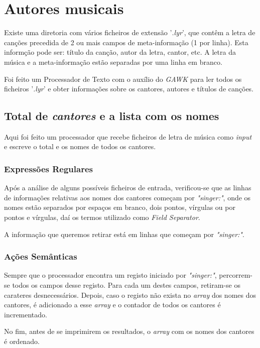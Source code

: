\documentclass{article}
\begin{document}
\section{Autores musicais}

Existe uma diretoria com vários ficheiros de extensão '\emph{.lyr}', que contêm a letra de canções precedida de 2 ou mais campos de meta-informação (1 por linha). Esta informção pode ser: título da canção, autor da letra, cantor, etc. A letra da música e a meta-informação estão separadas por uma linha em branco.

Foi feito um Processador de Texto com o auxílio do \emph{GAWK} para ler todos os ficheiros '\emph{.lyr}' e obter informações sobre os cantores, autores e títulos de canções.

\subsection{Total de \emph{cantores} e a lista com os nomes}

Aqui foi feito um processador que recebe ficheiros de letra de música como \emph{input} e escreve o total e os nomes de todos os cantores.

\subsubsection{Expressões Regulares}

Após a análise de alguns possíveis ficheiros de entrada, verificou-se que as linhas de informações relativas aos nomes dos cantores começam por \emph{"singer:"}, onde os nomes estão separados por espaços em branco, dois pontos, vírgulas ou por pontos e vírgulas, daí os termos utilizado como \emph{Field Separator}.

A informação que queremos retirar está em linhas que começam por \emph{"singer:"}.

\subsubsection{Ações Semânticas}

Sempre que o processador encontra um registo iniciado por \emph{"singer:"}, percorrem-se todos os campos desse registo. Para cada um destes campos, retiram-se os carateres desnecessários. Depois, caso o registo não exista no \emph{array} dos nomes dos cantores, é adicionado a esse \emph{array} e o contador de todos os cantores é incrementado.

No fim, antes de se imprimirem os resultados, o \emph{array} com os nomes dos cantores é ordenado.
\end{document}
